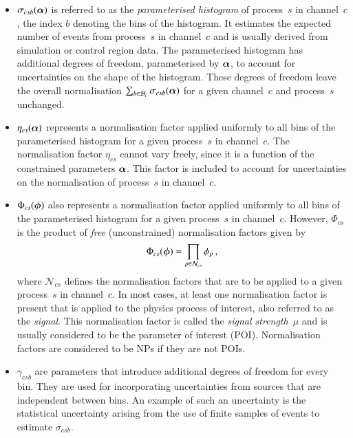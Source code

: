 \begin{itemize}

\item $\sigma_{csb}(\bm{\alpha})$ is referred to as the \emph{parameterised
    histogram} of process~$s$ in channel~$c$, the index $b$ denoting the bins of
  the histogram. It estimates the expected number of events from process~$s$ in
  channel~$c$ and is usually derived from simulation or control region data. The
  parameterised histogram has additional degrees of freedom, parameterised by
  $\bm{\alpha}$, to account for uncertainties on the shape of the
  histogram. These degrees of freedom leave the overall normalisation
  $\sum_{b \in \mathcal{B}_{c}} \sigma_{csb}(\bm{\alpha})$ for a given
  channel~$c$ and process~$s$ unchanged.

\item $\eta_{cs}(\bm{\alpha})$ represents a normalisation factor applied
  uniformly to all bins of the parameterised histogram for a given process~$s$
  in channel~$c$. The normalisation factor $\eta_{cs}$ cannot vary freely, since
  it is a function of the constrained parameters $\bm{\alpha}$. This factor
  is included to account for uncertainties on the normalisation of process~$s$
  in channel~$c$.

\item $\Phi_{cs}(\bm{\phi})$ also represents a normalisation factor applied
  uniformly to all bins of the parameterised histogram for a given process~$s$
  in channel~$c$. However, $\Phi_{cs}$ is the product of \emph{free}
  (unconstrained) normalisation factors given by
  \begin{align*}
    \Phi_{cs}(\bm{\phi}) = \prod_{p \in \mathcal{N}_{cs}} \phi_p \,\text{,}
  \end{align*}
  where $\mathcal{N}_{cs}$ defines the normalisation factors that are to be
  applied to a given process~$s$ in channel~$c$.
  In most cases, at least one normalisation factor is present that is applied to
  the physics process of interest, also referred to as the \emph{signal}. This
  normalisation factor is called the \emph{signal strength}~$\mu$ and is usually
  considered to be the parameter of interest (POI). Normalisation factors are
  considered to be NPs if they are not POIs.

\item $\gamma_{csb}$ are parameters that introduce additional degrees of freedom
  for every bin. They are used for incorporating uncertainties from sources that
  are independent between bins. An example of such an uncertainty is the
  statistical uncertainty arising from the use of finite samples of events to
  estimate $\sigma_{csb}$.


\end{itemize}
